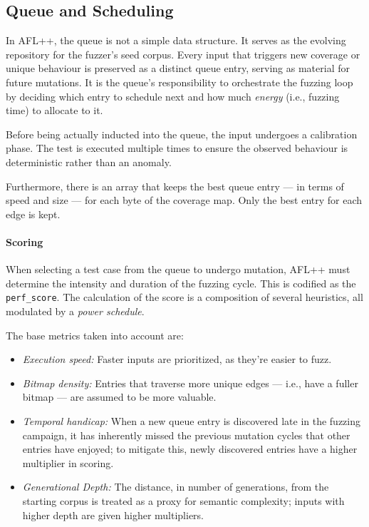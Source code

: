 \subsection{Queue and Scheduling}
\label{subsec:qandsched}

In AFL++, the queue is not a simple data structure. It serves as the evolving repository for the fuzzer's seed corpus. Every input that triggers new coverage or unique behaviour is preserved as a distinct queue entry, serving as material for future mutations. It is the queue's responsibility to orchestrate the fuzzing loop by deciding which entry to schedule next and how much \textit{energy} (i.e., fuzzing time) to allocate to it.

Before being actually inducted into the queue, the input undergoes a calibration phase. The test is executed multiple times to ensure the observed behaviour is deterministic rather than an anomaly.

Furthermore, there is an array that keeps the best queue entry --- in terms of speed and size --- for each byte of the coverage map. Only the best entry for each edge is kept.

\paragraph{Scoring} When selecting a test case from the queue to undergo mutation, AFL++ must determine the intensity and duration of the fuzzing cycle. This is codified as the \texttt{perf\_score}. The calculation of the score is a composition of several heuristics, all modulated by a \textit{power schedule}.

The base metrics taken into account are: 
\begin{itemize}
    \item \textit{Execution speed:} Faster inputs are prioritized, as they're easier to fuzz.

    \item \textit{Bitmap density:} Entries that traverse more unique edges --- i.e., have a fuller bitmap --- are assumed to be more valuable.

    \item \textit{Temporal handicap:} When a new queue entry is discovered late in the fuzzing campaign, it has inherently missed the previous mutation cycles that other entries have enjoyed; to mitigate this, newly discovered entries have a higher multiplier in scoring.

    \item \textit{Generational Depth:} The distance, in number of generations, from the starting corpus is treated as a proxy for semantic complexity; inputs with higher depth are given higher multipliers.
\end{itemize}

